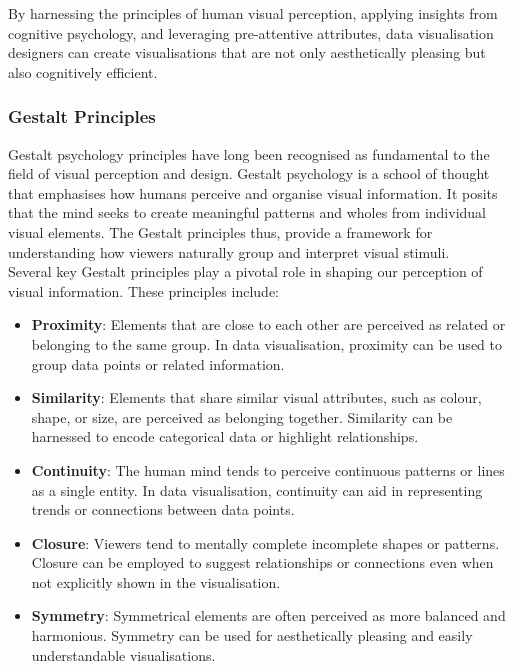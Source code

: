 \documentclass{article}\usepackage[]{graphicx}\usepackage[]{xcolor}
\begin{document}
By harnessing the principles of human visual perception, applying insights from cognitive psychology, and leveraging pre-attentive attributes, data visualisation designers can create visualisations that are not only aesthetically pleasing but also cognitively efficient.	

\subsubsection{Gestalt Principles}
Gestalt psychology principles have long been recognised as fundamental to the field of visual perception and design. Gestalt psychology is a school of thought that emphasises how humans perceive and organise visual information. It posits that the mind seeks to create meaningful patterns and wholes from individual visual elements. The Gestalt principles thus, provide a framework for understanding how viewers naturally group and interpret visual stimuli.\\

Several key Gestalt principles play a pivotal role in shaping our perception of visual information. These principles include: 
\begin{itemize}
    \item \textbf{Proximity}: Elements that are close to each other are perceived as related or belonging to the same group. In data visualisation, proximity can be used to group data points or related information.
    \item \textbf{Similarity}: Elements that share similar visual attributes, such as colour, shape, or size, are perceived as belonging together. Similarity can be harnessed to encode categorical data or highlight relationships. 
    \item \textbf{Continuity}: The human mind tends to perceive continuous patterns or lines as a single entity. In data visualisation, continuity can aid in representing trends or connections between data points.
    \item \textbf{Closure}: Viewers tend to mentally complete incomplete shapes or patterns. Closure can be employed to suggest relationships or connections even when not explicitly shown in the visualisation.
    \item \textbf{Symmetry}: Symmetrical elements are often perceived as more balanced and harmonious. Symmetry can be used for aesthetically pleasing and easily understandable visualisations.
\end{itemize}
\end{document}
